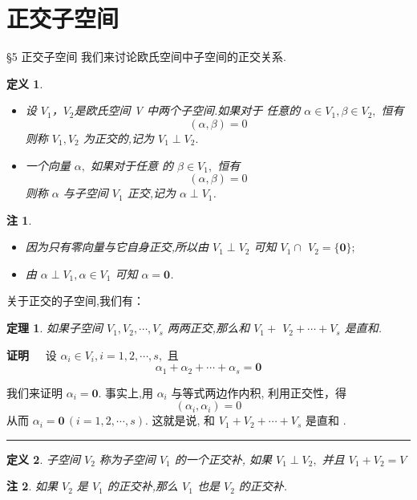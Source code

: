 \documentclass[13pt]{beamer}
\newtheorem{thm}{定理}
\newtheorem*{defi}{定义}
\newtheorem*{rem}{注}
\def\qed{\nopagebreak\hfill{\rule{4pt}{7pt}}\medbreak}
\def\pf{{\bf 证明~~ }}
\def\0{\mathbf{0}}
\begin{document}
\section{正交子空间}
\begin{frame}{\S 5 正交子空间}
我们来讨论欧氏空间中子空间的正交关系. 
\begin{defi}
\begin{itemize}
\item 设 $V_1$，$V_2$是欧氏空间 V 中两个子空间.如果对于 任意的 ${\alpha} \in V_{1}, {\beta} \in V_{2},$ 恒有
\[
({\alpha}, {\beta})= {0}
\]
则称 $V_{1}, V_{2}$ 为\alert{正交}的,记为 $V_{1} \perp V_{2} .$ 
\item 一个向量 ${\alpha},$ 如果对于任意 的 ${\beta} \in V_{1},$ 恒有
\[
({\alpha}, {\beta})=0
\]
则称 ${\alpha}$ 与子空间 $V_{1}$ \alert{正交},记为 ${\alpha} \perp V_{1}$.
\end{itemize}
\end{defi}
\end{frame}


\begin{frame}
\begin{rem}
	\begin{itemize}
		\item 因为只有零向量与它自身正交,所以由 $V_{1} \perp V_{2}$ 可知 $V_{1} \cap$ $V_{2}=\{{\0}\} ;$ 
		\item 由 ${\alpha} \perp V_{1}, {\alpha} \in V_{1}$ 可知 ${\alpha}={\0}$.
	\end{itemize}
\end{rem}
关于正交的子空间,我们有： 
\begin{thm}
	如果子空间 $V_{1}, V_{2}, \cdots, V_{s}$ 两两正交,那么和 $V_{1}+$ $V_{2}+\cdots+V_s$ 是直和. 
\end{thm}
\pf 设 ${\alpha}_{i} \in V_{i}, i=1,2, \cdots, s,$ 且
\[
{\alpha}_{1}+{\alpha}_{2}+\cdots+{\alpha}_{s}={\0}
\]
 
我们来证明 ${\alpha}_{i}={\0}$.  事实上,用 ${\alpha}_{i}$ 与等式两边作内积, 利用正交性，得
\[
\left({\alpha}_{i}, {\alpha}_{i}\right)= 0
\]
从而 ${\alpha}_{i}={\0}\, (i=1,2, \cdots, s) .$ 这就是说, 和
$
V_{1}+V_{2}+\cdots+V_{s}
$
是直和 . \qed
\end{frame}


\begin{frame}
\begin{defi}
子空间 $V_{2}$ 称为子空间 $V_{1}$ 的一个\alert{正交补}, 如果 $V_{1} \perp V_{2},$ 并且 $V_{1}+V_{2}=V$
\end{defi}
\begin{rem}
如果 $V_{2}$ 是 $V_{1}$ 的正交补,那么 $V_{1}$ 也是 $V_{2}$ 的正交补.
\end{rem}
\end{frame}
\end{document}
